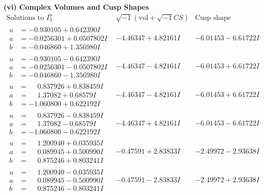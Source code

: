 \documentclass[1p]{elsarticle_modified}
\theoremstyle{definition}
\newcommand{\I}{\sqrt{-1}}
\begin{document}
\newpage\flushleft \textbf{(vi) Complex Volumes and Cusp Shapes}
$$\begin{array}{c|c|c}  
\text{Solutions to }I^u_{3}& \I (\text{vol} + \sqrt{-1}CS) & \text{Cusp shape}\\
 \hline 
\begin{aligned}
u &= -0.930105 + 0.642390 I \\
a &= -0.0256301 + 0.0507802 I \\
b &= -0.046860 + 1.356980 I\end{aligned}
 & -4.46347 + 4.82161 I & -6.01453 - 6.61722 I \\ \hline\begin{aligned}
u &= -0.930105 - 0.642390 I \\
a &= -0.0256301 - 0.0507802 I \\
b &= -0.046860 - 1.356980 I\end{aligned}
 & -4.46347 - 4.82161 I & -6.01453 + 6.61722 I \\ \hline\begin{aligned}
u &= \phantom{-}0.837926 + 0.838459 I \\
a &= \phantom{-}1.37082 + 0.68579 I \\
b &= -1.060800 + 0.622192 I\end{aligned}
 & -4.46347 - 4.82161 I & -6.01453 + 6.61722 I \\ \hline\begin{aligned}
u &= \phantom{-}0.837926 - 0.838459 I \\
a &= \phantom{-}1.37082 - 0.68579 I \\
b &= -1.060800 - 0.622192 I\end{aligned}
 & -4.46347 + 4.82161 I & -6.01453 - 6.61722 I \\ \hline\begin{aligned}
u &= \phantom{-}1.200940 + 0.035935 I \\
a &= \phantom{-}0.089945 + 0.500990 I \\
b &= \phantom{-}0.875246 + 0.803241 I\end{aligned}
 & -0.47591 + 2.83833 I & -2.49972 - 2.93638 I \\ \hline\begin{aligned}
u &= \phantom{-}1.200940 - 0.035935 I \\
a &= \phantom{-}0.089945 - 0.500990 I \\
b &= \phantom{-}0.875246 - 0.803241 I\end{aligned}
 & -0.47591 - 2.83833 I & -2.49972 + 2.93638 I \\ \hline\begin{aligned}

\end{aligned}
\end{array}$$
\end{document}
